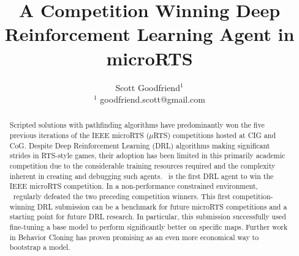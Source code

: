 \documentclass{article}
\begin{document}
\title{A Competition Winning Deep Reinforcement Learning Agent in microRTS}
\author{Scott Goodfriend$^{1}$ \\
$^{1}$ goodfriend.scott@gmail.com \\
}
\maketitle
\begin{abstract}
    Scripted solutions with pathfinding algorithms have predominantly won the five
    previous iterations of the IEEE microRTS ($\mu$RTS) competitions hosted at CIG and
    CoG. Despite Deep Reinforcement Learning (DRL) algorithms making significant strides
    in RTS-style games, their adoption has been limited in this primarily academic
    competition due to the considerable training resources required and the complexity
    inherent in creating and debugging such agents. \agentName\ is the first DRL agent
    to win the IEEE microRTS competition. In a
    non-performance constrained environment, \agentName\ regularly defeated the two
    preceding competition winners. This first competition-winning DRL submission can be
    a benchmark for future microRTS competitions and a starting point for future DRL
    research. In particular, this submission successfully used fine-tuning a base model
    to perform significantly better on specific maps. Further work in Behavior Cloning
    has proven promising as an even more economical way to bootstrap a model.
\end{abstract}
\end{document}

